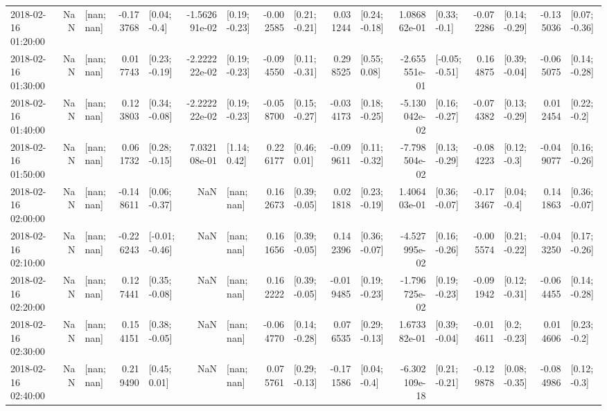 \begin{tabular}{lrlrlrlrlrlrlrlrl}
2018-02-16 01:20:00 &       NaN &      [nan; nan] & -0.173768 &    [0.04; -0.4] & -1.562691e-02 &   [0.19; -0.23] & -0.002585 &   [0.21; -0.21] &  0.031244 &   [0.24; -0.18] &  1.086862e-01 &    [0.33; -0.1] & -0.072286 &   [0.14; -0.29] & -0.135036 &   [0.07; -0.36] \\
2018-02-16 01:30:00 &       NaN &      [nan; nan] &  0.017743 &   [0.23; -0.19] & -2.222222e-02 &   [0.19; -0.23] & -0.094550 &   [0.11; -0.31] &  0.298525 &    [0.55; 0.08] & -2.655551e-01 &  [-0.05; -0.51] &  0.164875 &   [0.39; -0.04] & -0.065075 &   [0.14; -0.28] \\
2018-02-16 01:40:00 &       NaN &      [nan; nan] &  0.123803 &   [0.34; -0.08] & -2.222222e-02 &   [0.19; -0.23] & -0.058700 &   [0.15; -0.27] & -0.034173 &   [0.18; -0.25] & -5.130042e-02 &   [0.16; -0.27] & -0.074382 &   [0.13; -0.29] &  0.012454 &    [0.22; -0.2] \\
2018-02-16 01:50:00 &       NaN &      [nan; nan] &  0.061732 &   [0.28; -0.15] &  7.032108e-01 &    [1.14; 0.42] &  0.226177 &    [0.46; 0.01] & -0.099611 &   [0.11; -0.32] & -7.798504e-02 &   [0.13; -0.29] & -0.084223 &    [0.12; -0.3] & -0.049077 &   [0.16; -0.26] \\
2018-02-16 02:00:00 &       NaN &      [nan; nan] & -0.148611 &   [0.06; -0.37] &           NaN &      [nan; nan] &  0.162673 &   [0.39; -0.05] &  0.021818 &   [0.23; -0.19] &  1.406403e-01 &   [0.36; -0.07] & -0.173467 &    [0.04; -0.4] &  0.141863 &   [0.36; -0.07] \\
2018-02-16 02:10:00 &       NaN &      [nan; nan] & -0.226243 &  [-0.01; -0.46] &           NaN &      [nan; nan] &  0.161656 &   [0.39; -0.05] &  0.142396 &   [0.36; -0.07] & -4.527995e-02 &   [0.16; -0.26] & -0.005574 &   [0.21; -0.22] & -0.043250 &   [0.17; -0.26] \\
2018-02-16 02:20:00 &       NaN &      [nan; nan] &  0.127441 &   [0.35; -0.08] &           NaN &      [nan; nan] &  0.162222 &   [0.39; -0.05] & -0.019485 &   [0.19; -0.23] & -1.796725e-02 &   [0.19; -0.23] & -0.091942 &   [0.12; -0.31] & -0.064455 &   [0.14; -0.28] \\
2018-02-16 02:30:00 &       NaN &      [nan; nan] &  0.154151 &   [0.38; -0.05] &           NaN &      [nan; nan] & -0.064770 &   [0.14; -0.28] &  0.076535 &   [0.29; -0.13] &  1.673382e-01 &   [0.39; -0.04] & -0.014611 &    [0.2; -0.23] &  0.014606 &    [0.23; -0.2] \\
2018-02-16 02:40:00 &       NaN &      [nan; nan] &  0.219490 &    [0.45; 0.01] &           NaN &      [nan; nan] &  0.075761 &   [0.29; -0.13] & -0.171586 &    [0.04; -0.4] & -6.302109e-18 &   [0.21; -0.21] & -0.129878 &   [0.08; -0.35] & -0.084986 &    [0.12; -0.3] \\

\end{tabular}
